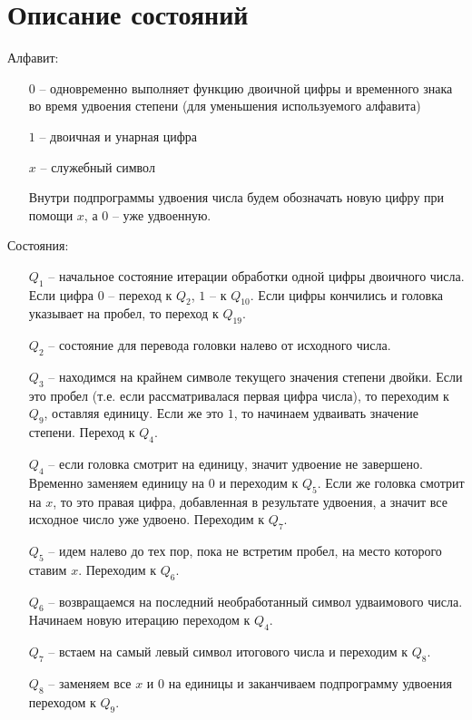\documentclass[a4paper,12pt]{article}
\begin{document}
    \section{Описание состояний}
    Алфавит:
    \begin{itemize}
        \item[$0$] -- одновременно выполняет функцию двоичной цифры и временного знака во время удвоения степени (для уменьшения используемого алфавита)
        \item[$1$] -- двоичная и унарная цифра
        \item[$x$] -- служебный символ
        \item[] Внутри подпрограммы удвоения числа будем обозначать новую цифру при помощи $x$, а $0$ -- уже удвоенную.
    \end{itemize}
    Состояния:
    \begin{itemize}
        \item[$Q_1$] -- начальное состояние итерации обработки одной цифры двоичного числа.
        Если цифра $0$ -- переход к $Q_2$, $1$ -- к $Q_{10}$.
        Если цифры кончились и головка указывает на пробел, то переход к $Q_{19}$.
        \item[$Q_2$] -- состояние для перевода головки налево от исходного числа.
        \item[$Q_3$] -- находимся на крайнем символе текущего значения степени двойки.
        Если это пробел (т.е. если рассматривалася первая цифра числа), то переходим к $Q_9$, оставляя единицу.
        Если же это $1$, то начинаем удваивать значение степени.
        Переход к $Q_4$.
        \item[$Q_4$] -- если головка смотрит на единицу, значит удвоение не завершено.
        Временно заменяем единицу на $0$ и переходим к $Q_5$.
        Если же головка смотрит на $x$, то это правая цифра, добавленная в результате удвоения, а значит все исходное число уже удвоено.
        Переходим к $Q_7$.
        \item[$Q_5$] -- идем налево до тех пор, пока не встретим пробел, на место которого ставим $x$.
        Переходим к $Q_6$.
        \item[$Q_6$] -- возвращаемся на последний необработанный символ удваимового числа.
        Начинаем новую итерацию переходом к $Q_4$.
        \item[$Q_7$] -- встаем на самый левый символ итогового числа и переходим к $Q_8$.
        \item[$Q_8$] -- заменяем все $x$ и $0$ на единицы и заканчиваем подпрограмму удвоения переходом к $Q_9$.

\end{itemize}
\end{document}
